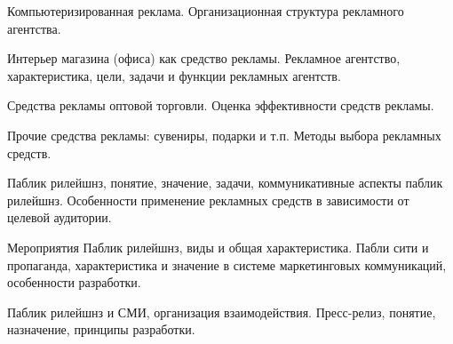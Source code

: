 \documentclass[
	14pt,
	a4paper,
	]
	{scrartcl}
\begin{document}
\vfill
\z Компьютеризированная реклама.
 \vfill
\z Организационная структура рекламного агентства.
 \vfill

\vfill

\newpage


\shapk
{}
\setcounter{zad}{0}

\vfill
\z Интерьер магазина (офиса) как средство рекламы.
 \vfill
\z Рекламное агентство, характеристика, цели, задачи и функции рекламных агентств.
 \vfill

\vfill

\newpage


\shapk
{}
\setcounter{zad}{0}

\vfill
\z Средства рекламы оптовой торговли.
 \vfill
\z Оценка эффективности средств рекламы.
 \vfill

\vfill

\newpage


\shapk
{}
\setcounter{zad}{0}

\vfill
\z Прочие средства рекламы: сувениры, подарки и т.п.
 \vfill
\z Методы выбора рекламных средств.
 \vfill

\vfill

\newpage


\shapk
{}
\setcounter{zad}{0}

\vfill
\z Паблик рилейшнз, понятие, значение, задачи, коммуникативные аспекты паблик рилейшнз.
 \vfill
\z Особенности применение рекламных средств в зависимости от целевой аудитории.
 \vfill

\vfill

\newpage


\shapk
{}
\setcounter{zad}{0}

\vfill
\z Мероприятия Паблик рилейшнз, виды и общая характеристика.
 \vfill
\z Пабли сити и пропаганда, характеристика и значение в системе маркетинговых коммуникаций, особенности разработки.
 \vfill

\vfill

\newpage


\shapk
{}
\setcounter{zad}{0}

\vfill
\z Паблик рилейшнз и СМИ, организация взаимодействия.
 \vfill
\z Пресс-релиз, понятие, назначение, принципы разработки.
 \vfill

\vfill

\newpage
\end{document}
